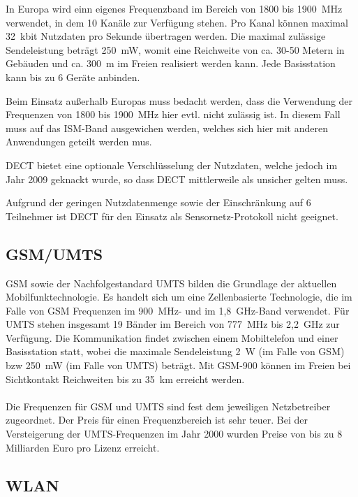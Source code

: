         In Europa wird einn eigenes Frequenzband im Bereich von 1800 bis 1900~MHz verwendet, in dem 10 
        Kanäle zur Verfügung stehen. Pro Kanal können maximal 32~kbit Nutzdaten pro Sekunde übertragen
        werden. Die maximal zulässige Sendeleistung beträgt 250~mW, womit eine Reichweite von ca. 30-50
        Metern in Gebäuden und ca. 300~m im Freien realisiert werden kann. Jede Basisstation kann
        bis zu 6 Geräte anbinden.

        Beim Einsatz außerhalb Europas muss bedacht werden, dass die Verwendung der Frequenzen von
        1800 bis 1900~MHz hier evtl. nicht zulässig ist. In diesem Fall muss auf das ISM-Band 
        ausgewichen werden, welches sich hier mit anderen Anwendungen geteilt werden mus.

        DECT bietet eine optionale Verschlüsselung der Nutzdaten, welche jedoch im Jahr 2009 geknackt
        wurde, so dass DECT mittlerweile als unsicher gelten muss.

        Aufgrund der geringen Nutzdatenmenge sowie der Einschränkung auf 6 Teilnehmer ist
        DECT für den Einsatz als Sensornetz-Protokoll nicht geeignet.

    \subsection{GSM/UMTS}
        GSM sowie der Nachfolgestandard UMTS bilden die Grundlage der aktuellen Mobilfunktechnologie.
        Es handelt sich um eine Zellenbasierte Technologie, die im Falle von GSM Frequenzen im
        900~MHz- und im 1,8~GHz-Band verwendet. Für UMTS stehen insgesamt 19 Bänder im Bereich von 777~MHz 
        bis 2,2~GHz zur Verfügung. Die Kommunikation findet zwischen einem Mobiltelefon und einer
        Basisstation statt, wobei die maximale Sendeleistung 2~W (im Falle von GSM) bzw 250~mW (im Falle
        von UMTS) beträgt. Mit GSM-900 können im Freien bei Sichtkontakt Reichweiten bis zu 35~km erreicht
        werden.\\
        \\
        Die Frequenzen für GSM und UMTS sind fest dem jeweiligen Netzbetreiber zugeordnet. Der Preis
        für einen Frequenzbereich ist sehr teuer. Bei der Versteigerung der UMTS-Frequenzen im 
        Jahr 2000 wurden Preise von bis zu 8 Milliarden Euro pro Lizenz erreicht. 
    \subsection{WLAN}\label{wlan}
